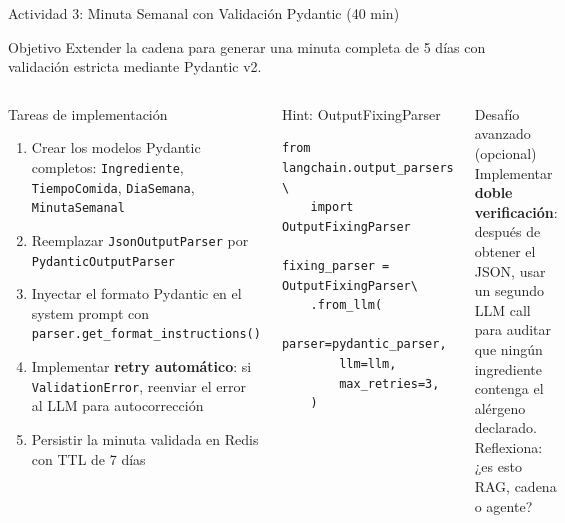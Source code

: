 \documentclass[aspectratio=169]{beamer}
\begin{document}
\begin{frame}[fragile]{Actividad 3: Minuta Semanal con Validación Pydantic (40 min)}
  \begin{block}{Objetivo}
    Extender la cadena para generar una minuta completa de 5 días
    con validación estricta mediante Pydantic v2.
  \end{block}
  \vspace{0.3em}
  \begin{columns}
    \begin{exampleblock}{Tareas de implementación}
      \begin{enumerate}
        \item Crear los modelos Pydantic completos: \texttt{Ingrediente}, \texttt{TiempoComida}, \texttt{DiaSemana}, \texttt{MinutaSemanal}
        \item Reemplazar \texttt{JsonOutputParser} por \texttt{PydanticOutputParser}
        \item Inyectar el formato Pydantic en el system prompt con \texttt{parser.get\_format\_instructions()}
        \item Implementar \textbf{retry automático}: si \texttt{ValidationError}, reenviar el error al LLM para autocorrección
        \item Persistir la minuta validada en Redis con TTL de 7 días
      \end{enumerate}
    \end{exampleblock}
    \begin{block}{Hint: OutputFixingParser}
\begin{lstlisting}[style=pythonstyle]
from langchain.output_parsers \
    import OutputFixingParser

fixing_parser = OutputFixingParser\
    .from_llm(
        parser=pydantic_parser,
        llm=llm,
        max_retries=3,
    )
\end{lstlisting}
    \end{block}
    \vspace{0.2em}
    \begin{alertblock}{Desafío avanzado (opcional)}
      Implementar \textbf{doble verificación}: después de obtener el JSON,
      usar un segundo LLM call para auditar que ningún ingrediente contenga
      el alérgeno declarado.\\[0.3em]
      Reflexiona: ¿es esto RAG, cadena o agente?
    \end{alertblock}
  \end{columns}
\end{frame}
\end{document}
